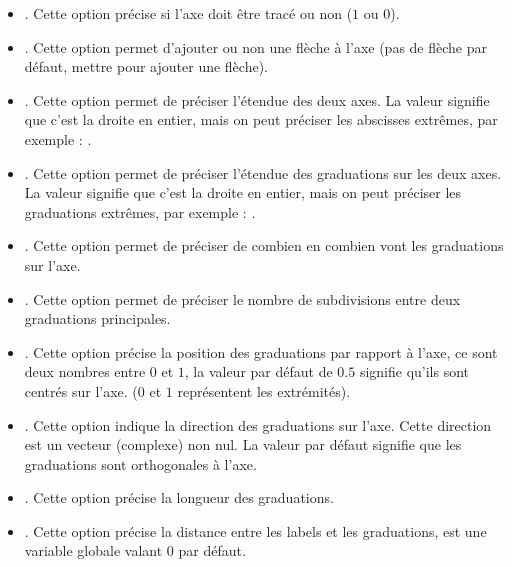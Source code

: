 \begin{itemize}
    \item {}. Cette option précise si l'axe doit être tracé ou non ($1$ ou $0$).
    
    \item {}. Cette option permet d'ajouter ou non une flèche à l'axe (pas de flèche par défaut, mettre  pour ajouter une flèche).
    
    \item {}. Cette option permet de préciser l'étendue des deux axes. La valeur  signifie que c'est la droite en entier, mais on peut préciser les abscisses extrêmes, par exemple : .
    
    \item {}. Cette option permet de préciser l'étendue des graduations sur les deux axes. La valeur  signifie que c'est la droite en entier, mais on peut préciser les graduations extrêmes, par exemple : .
    
    \item {}. Cette option permet de préciser de combien en combien vont les graduations sur l'axe.
    
    \item {}. Cette option permet de préciser le nombre de subdivisions entre deux graduations principales.
    
    \item {}. Cette option précise la position des graduations par rapport à l'axe, ce sont deux nombres entre $0$ et $1$, la valeur par défaut de $0.5$ signifie qu'ils sont centrés sur l'axe. ($0$ et $1$ représentent les extrémités).
    
    \item {}. Cette option indique la direction des graduations sur l'axe. Cette direction est un vecteur (complexe) non nul. La valeur par défaut  signifie que les graduations sont orthogonales à l'axe.
    
    \item {}. Cette option précise la longueur des graduations.
    
    \item {}. Cette option précise la distance entre les labels et les graduations,  est une variable globale valant $0$ par défaut.
    

\end{itemize}
